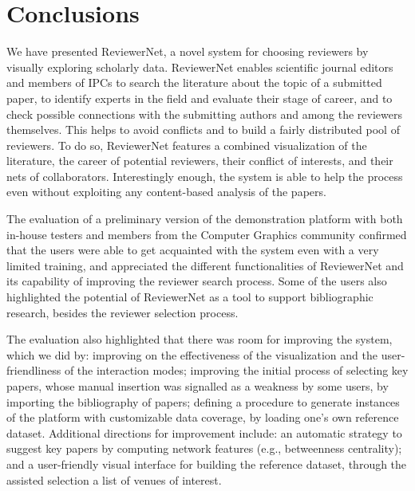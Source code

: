 
\chapter{Conclusions}
\label{sec:conclusions}

We have presented ReviewerNet, a novel system for choosing reviewers by visually exploring scholarly data. ReviewerNet enables scientific journal editors and members of IPCs to search the literature about the topic of a submitted paper, to identify experts in the field and evaluate their stage of career, and to check possible connections with the submitting authors and among the reviewers themselves. This helps to avoid conflicts and to build a fairly distributed pool of reviewers. To do so, ReviewerNet features a combined visualization of the literature, the career of potential reviewers, their conflict of interests, and their nets of collaborators. Interestingly enough, the system is able to help the process even without exploiting any content-based analysis of the papers.


The evaluation of a preliminary version of the demonstration platform with both in-house testers and members from the Computer Graphics community confirmed that the users were able to get acquainted with the system even with a very limited training, and  appreciated the different functionalities of ReviewerNet and its capability of improving the reviewer search process.  
Some of the users also highlighted the potential of ReviewerNet as a tool to support bibliographic research, besides the reviewer selection process. 

The evaluation also highlighted that there was room for improving the system, which we did by: improving on the effectiveness of the visualization and the user-friendliness of the interaction modes; improving the initial process of selecting key papers, whose manual insertion was signalled as a weakness by some users, by importing the bibliography of papers; defining a procedure to generate instances of the platform with customizable data coverage, by loading one's own reference dataset. Additional directions for improvement include: an automatic strategy to suggest key papers by computing network features (e.g., betweenness  centrality); and a user-friendly visual interface for building the reference dataset, through the assisted selection a list of venues of interest.   

